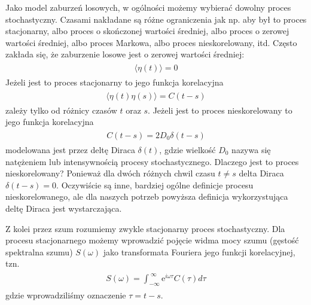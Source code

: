 \documentclass[a4paper,12pt,polish]{sphinxmanual}
\begin{document}
Jako model zaburzeń losowych, w ogólności możemy wybierać dowolny proces stochastyczny. Czasami nakładane są różne ograniczenia jak np. aby był to proces stacjonarny, albo proces o skończonej wartości średniej, albo proces o zerowej wartości średniej, albo proces Markowa, albo proces nieskorelowany, itd. Często zakłada się, że zaburzenie losowe jest o zerowej wartości średniej:
\label{ch3/chIII021:equation-eqn1}\begin{gather}
\begin{split}\langle \eta(t)\rangle = 0\end{split}\label{ch3/chIII021-eqn1}
\end{gather}
Jeżeli jest to proces stacjonarny to jego funkcja korelacyjna
\label{ch3/chIII021:equation-eqn2}\begin{gather}
\begin{split}\langle \eta(t) \eta(s)\rangle = C(t-s)\end{split}\label{ch3/chIII021-eqn2}
\end{gather}
zależy tylko od różnicy czasów $t$ oraz $s$. Jeżeli jest to proces nieskorelowany to jego funkcja korelacyjna
\label{ch3/chIII021:equation-eqn3}\begin{gather}
\begin{split}C(t-s) = 2D_0 \delta(t-s)\end{split}\label{ch3/chIII021-eqn3}
\end{gather}
modelowana jest przez deltę Diraca $\delta(t)$, gdzie wielkość $D_0$ nazywa się natężeniem lub intensywnością procesy stochastycznego. Dlaczego jest to proces nieskorelowany? Ponieważ dla dwóch różnych chwil czasu $t \ne s$ delta Diraca $\delta(t-s) = 0$. Oczywiście są inne, bardziej ogólne definicje procesu nieskorelowanego, ale dla naszych potrzeb powyższa definicja wykorzystująca deltę Diraca jest wystarczająca.

Z kolei przez szum rozumiemy zwykle stacjonarny proces stochastyczny. Dla procesu stacjonarnego możemy wprowadzić pojęcie widma mocy szumu (gęstość spektralna szumu) $S(\omega)$ jako transformata Fouriera jego funkcji korelacyjnej, tzn.
\label{ch3/chIII021:equation-eqn4}\begin{gather}
\begin{split}S(\omega) = \int_{-\infty}^{ \; \infty} \mbox{e}^{i\omega \tau} C(\tau) d\tau\end{split}\label{ch3/chIII021-eqn4}
\end{gather}
gdzie wprowadziliśmy oznaczenie $\tau = t- s$.
\end{document}
